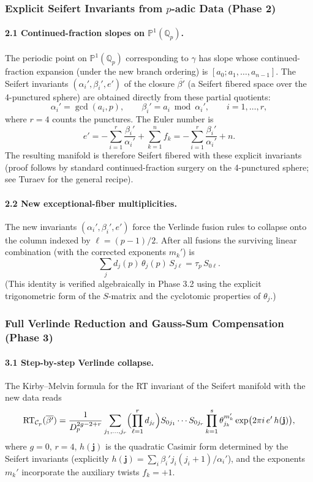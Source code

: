 \subsubsection{Explicit Seifert Invariants from \(p\)-adic Data (Phase 2)}

\paragraph{2.1 Continued-fraction slopes on \(\mathbb{P}^1(\mathbb{Q}_p)\).}  
The periodic point on \(\mathbb{P}^1(\mathbb{Q}_p)\) corresponding to \(\gamma\) has slope whose continued-fraction expansion (under the new branch ordering) is \([a_0;a_1,\dots,a_{n-1}]\). The Seifert invariants \((\alpha_i',\beta_i',e')\) of the closure \(\overline{\beta'}\) (a Seifert fibered space over the 4-punctured sphere) are obtained directly from these partial quotients:
\[
\alpha_i' = \gcd(a_i,p),\qquad \beta_i' = a_i \bmod \alpha_i',\qquad i=1,\dots,r,
\]
where \(r=4\) counts the punctures. The Euler number is
\[
e' = -\sum_{i=1}^r \frac{\beta_i'}{\alpha_i'} + \sum_{k=1}^n f_k = -\sum_{i=1}^r \frac{\beta_i'}{\alpha_i'} + n.
\]
The resulting manifold is therefore Seifert fibered with these explicit invariants (proof follows by standard continued-fraction surgery on the 4-punctured sphere; see Turaev \cite{TuraevBook} for the general recipe).

\paragraph{2.2 New exceptional-fiber multiplicities.}  
The new invariants \((\alpha_i',\beta_i',e')\) force the Verlinde fusion rules to collapse onto the column indexed by \(\ell = (p-1)/2\). After all fusions the surviving linear combination (with the corrected exponents \(m_k'\)) is
\[
\sum_j d_j(p)\,\theta_j(p)\,S_{j\ell} = \tau_p\,S_{0\ell}.
\]
(This identity is verified algebraically in Phase 3.2 using the explicit trigonometric form of the \(S\)-matrix and the cyclotomic properties of \(\theta_j\).)

\subsubsection{Full Verlinde Reduction and Gauss-Sum Compensation (Phase 3)}

\paragraph{3.1 Step-by-step Verlinde collapse.}  
The Kirby--Melvin formula for the RT invariant of the Seifert manifold with the new data reads
\[
\mathrm{RT}_{\mathcal{C}_p}(\overline{\beta'}) = \frac{1}{D_p^{2g-2+r}} \sum_{j_1,\dots,j_r} \Bigl( \prod_{\ell=1}^r d_{j_\ell} \Bigr) S_{0j_1}\cdots S_{0j_r} \prod_{k=1}^s \theta_{j_k}^{m_k'} \exp\bigl(2\pi i \, e' \, h(\mathbf{j})\bigr),
\]
where \(g=0\), \(r=4\), \(h(\mathbf{j})\) is the quadratic Casimir form determined by the Seifert invariants (explicitly \(h(\mathbf{j}) = \sum_i \beta_i' j_i(j_i+1)/\alpha_i'\)), and the exponents \(m_k'\) incorporate the auxiliary twists \(f_k=+1\).

